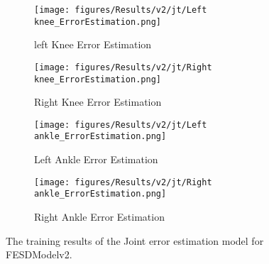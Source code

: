   
  \begin{figure}[!ht]
    \centering
    \begin{subfigure}[b]{0.47\linewidth}
        \centering
        \texttt{[image: figures/Results/v2/jt/Left knee\_ErrorEstimation.png]}
        \caption{left Knee Error Estimation}
        \label{fig:v2_lekn_jt_ee}
    \end{subfigure}
    \hfill
    \begin{subfigure}[b]{0.47\linewidth}
        \centering
        \texttt{[image: figures/Results/v2/jt/Right knee\_ErrorEstimation.png]}
        \caption{Right Knee Error Estimation}
        \label{fig:v2_rikn_jt_ee}
    \end{subfigure}
    \hfill
    \begin{subfigure}[b]{0.47\linewidth}
        \centering
        \texttt{[image: figures/Results/v2/jt/Left ankle\_ErrorEstimation.png]}
        \caption{Left Ankle Error Estimation}
        \label{fig:v2_lean_jt_ee}
    \end{subfigure}
    \hfill
    \begin{subfigure}[b]{0.47\linewidth}
        \centering
        \texttt{[image: figures/Results/v2/jt/Right ankle\_ErrorEstimation.png]}
        \caption{Right Ankle Error Estimation}
        \label{fig:v2_rian_jt_ee}
    \end{subfigure}
    \caption[Detailed Training results for FESDModelv2]{The training results of the Joint error estimation model for FESDModelv2.}
  \end{figure}